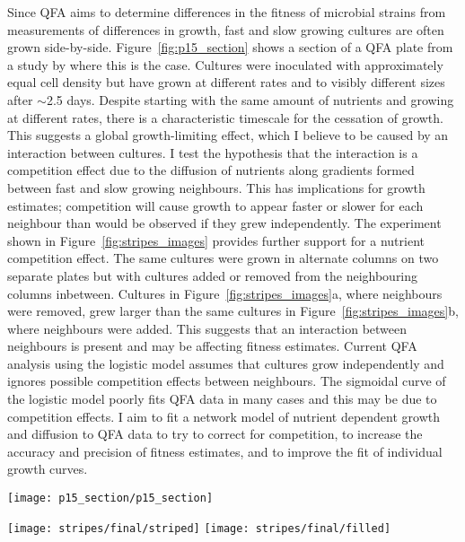 Since QFA aims to determine differences in the fitness of microbial
strains from measurements of differences in growth, fast and slow
growing cultures are often grown
side-by-side. Figure~\ref{fig:p15_section} shows a section of a QFA
plate from a study by \citet{Addinall2011} where this is the
case. Cultures were inoculated with approximately equal cell density
but have grown at different rates and to visibly different sizes after
\(\sim\)2.5 days. Despite starting with the same amount of nutrients
and growing at different rates, there is a characteristic timescale
for the cessation of growth. This suggests a global growth-limiting
effect, which I believe to be caused by an interaction between
cultures. I test the hypothesis that the interaction is a competition
effect due to the diffusion of nutrients along gradients formed
between fast and slow growing neighbours. This has implications for
growth estimates; competition will cause growth to appear faster or
slower for each neighbour than would be observed if they grew
independently. The experiment shown in Figure~\ref{fig:stripes_images}
provides further support for a nutrient competition effect. The same
cultures were grown in alternate columns on two separate plates but
with cultures added or removed from the neighbouring columns
inbetween. Cultures in Figure~\ref{fig:stripes_images}a, where
neighbours were removed, grew larger
than the same cultures in Figure~\ref{fig:stripes_images}b, where
neighbours were added. This suggests that an interaction between
neighbours is present and may be affecting fitness estimates. Current
QFA analysis using the logistic model assumes that cultures grow
independently and ignores possible competition effects between
neighbours. The sigmoidal curve of the logistic model poorly fits QFA
data in many cases
and this may be due to competition effects. I aim to fit a network
model of nutrient dependent growth and diffusion to QFA data to try to
correct for competition, to increase the accuracy and precision of
fitness estimates, and to improve the fit of individual growth curves.

\begin{Figure}
  \centering
  \texttt{[image: p15\_section/p15\_section]}
  \label{fig:p15_section}
\end{Figure}
\begin{Figure}
  \centering
  \texttt{[image: stripes/final/striped]}
  \texttt{[image: stripes/final/filled]}
  \label{fig:stripes_images}
\end{Figure}

